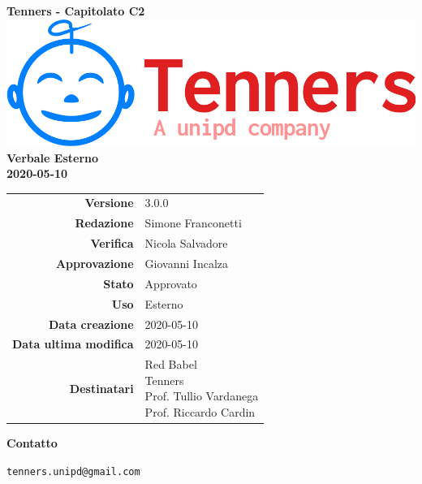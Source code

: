 \begin{titlepage}
	\begin{center}
		\large \textbf{Tenners - Capitolato C2}
		\vfill
		\includegraphics[scale = 0.3]{./res/img/logo.png}\\
		\vfill
		\Huge \textbf{Verbale Esterno} \\
		\textbf {2020-05-10}

        \vfill
        \large

        \begin{tabular}{r|l}
        	\textbf{Versione} & 3.0.0 \\
        	\textbf{Redazione} & Simone Franconetti \\
        	\textbf{Verifica} &  Nicola Salvadore \\
        	\textbf{Approvazione} & Giovanni Incalza \\
        	\textbf{Stato} & Approvato \\
        	\textbf{Uso} &  Esterno\\
        	\textbf{Data creazione} &  2020-05-10\\
        	\textbf{Data ultima modifica} & 2020-05-10 \\
        	\textbf{Destinatari} & \parbox[t]{5cm}{Red Babel\\Tenners \\ Prof. Tullio Vardanega\\ Prof. Riccardo Cardin}
        \end{tabular}
    	\vfill
    	\normalsize
    	\vfill
    	\textbf{Contatto}

    	\texttt{tenners.unipd@gmail.com}

	\end{center}
\end{titlepage}
